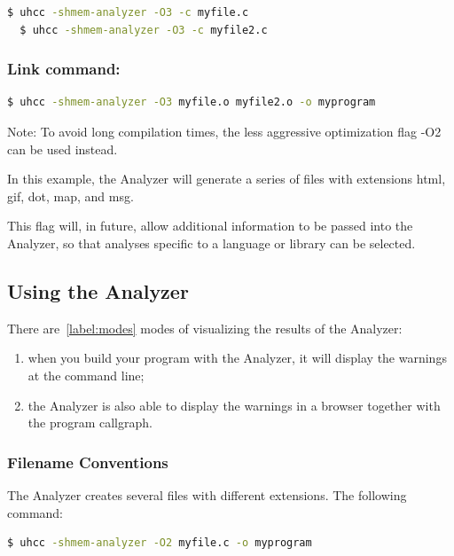 \begin{lstlisting}[language=bash]
  $ uhcc -shmem-analyzer -O3 -c myfile.c
  $ uhcc -shmem-analyzer -O3 -c myfile2.c
\end{lstlisting}

\subsubsection*{Link command:}

\begin{lstlisting}[language=bash]
  $ uhcc -shmem-analyzer -O3 myfile.o myfile2.o -o myprogram 
\end{lstlisting}

Note: To avoid long compilation times, the less aggressive
optimization flag -O2 can be used instead.

In this example, the \openshmem Analyzer will generate a
series of files with extensions html, gif, dot, map, and msg.

This flag will, in future, allow additional information to be passed
into the Analyzer, so that analyses specific to a language or library
can be selected.

\subsection{Using the \openshmem Analyzer}

There are~\ref{label:modes} modes of visualizing the results of the \openshmem
Analyzer:

\begin{enumerate}
\item when you build your program with the \openshmem Analyzer, it
  will display the warnings at the command line;
\item the \openshmem Analyzer is also able to display the warnings in
  a browser together with the program callgraph. \label{label:modes}
\end{enumerate}

\subsubsection{Filename Conventions}

The \openshmem Analyzer creates several files with different extensions. 
The following command:

\begin{lstlisting}[language=bash]
  $ uhcc -shmem-analyzer -O2 myfile.c -o myprogram
\end{lstlisting}

